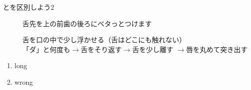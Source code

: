 \documentclass[aspectratio=169,xcolor={dvipsnames,table}]{beamer}
\begin{document}
\begin{frame}[plain]{とを区別しよう2}
\begin{description}
 \item[] 舌先を上の前歯の後ろにベタっとつけます
 \item[] 舌を口の中で少し浮かせる（舌はどこにも触れない）\\
	    「ダ」と何度も$\rightarrow$舌をそり返す$\rightarrow$舌を少し離す%
	    $\rightarrow$唇を丸めて突き出す\end{description}

\Large 

 \begin{enumerate}
  \item long\hfill{}\hspace{250pt}\mbox{}
  \item wrong\hfill{}\hspace{250pt}\mbox{}

 \end{enumerate}
\hfill{\scriptsize {}}
\end{frame}
\end{document}

